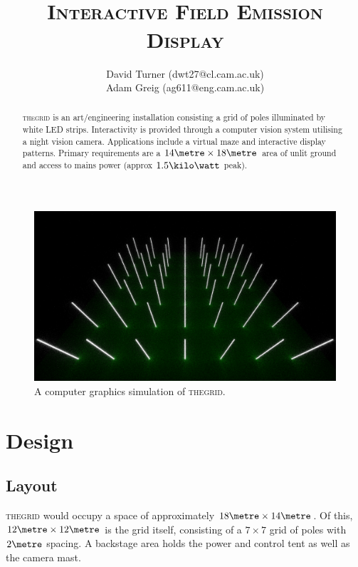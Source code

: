 \documentclass[12pt]{article} %
\title{\thegrid\\\small{\textsc{Interactive Field Emission Display}}}
\author{\small{David Turner (dwt27@cl.cam.ac.uk)}\\\small{Adam Greig (ag611@eng.cam.ac.uk)}}
\date{} %
\newcommand{\thegrid}{\textsc{the\textperiodcentered grid}\xspace}
\begin{document}
\maketitle

\renewcommand{\abstractname}{Summary}
\begin{abstract}
\thegrid is an art/engineering installation consisting a grid of poles illuminated by white LED strips.  Interactivity is provided through a computer vision system utilising a night vision camera.  Applications include a virtual maze and interactive display patterns.  Primary requirements are a $14\metre \times 18\metre$ area of unlit ground and access to mains power (approx $1.5\kilo\watt$ peak).
\end{abstract}

\begin{figure}[h]
    \centering
    \includegraphics[width=\textwidth]{pics/render1.png}
    \caption{A computer graphics simulation of \thegrid.}
\end{figure}

\clearpage
\section{Design}
\subsection{Layout}
\thegrid would occupy a space of approximately $18\metre \times 14\metre$.  Of this, $12\metre \times 12\metre$ is the grid itself, consisting of a $7 \times 7$ grid of poles with $2\metre$ spacing.  A backstage area holds the power and control tent as well as the camera mast.
\end{document}
